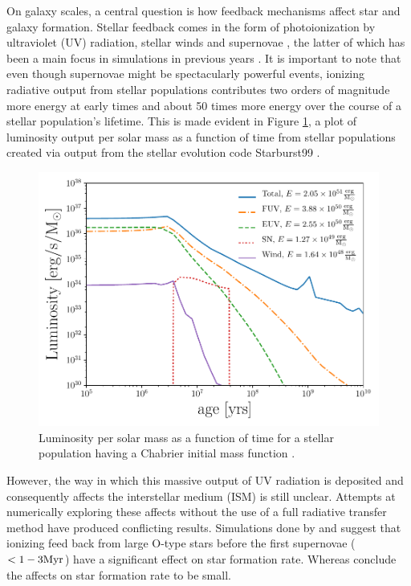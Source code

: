 \documentclass[fleq,usenatbib]{mnras}
\begin{document}
On galaxy scales, a central question is how feedback mechanisms affect star 
and galaxy formation. Stellar feedback comes in the form of photoionization by 
ultraviolet (UV) radiation, stellar winds and supernovae 
\citep{leithererEt99}, the latter of which has been a main focus in 
simulations in previous years \citep{agertzEt13}. It is important to note that 
even though supernovae might be spectacularly powerful events, ionizing 
radiative output from stellar populations contributes two orders of magnitude 
more energy at early times and about 50 times more energy over the course of a 
stellar population's lifetime. This is made evident in Figure \ref{fig:uvsn}, 
a plot of luminosity output per solar mass as a function of time from stellar 
populations created via output from the stellar evolution code Starburst99 
\citep{leithererEt99}. 
\begin{figure}
\includegraphics[width=1\linewidth]{Figures/uvsn.pdf}
\caption{Luminosity per solar mass as a function of time for a stellar 
population having a Chabrier initial mass function \citep{chabrier03}.}
\label{fig:uvsn}
\end{figure}

However, the way in which this massive output of UV radiation is deposited 
and consequently affects the interstellar medium (ISM) is still unclear. 
Attempts at numerically exploring these affects without the use of a full 
radiative transfer method have produced conflicting results. Simulations done
by \cite{gritschnederEt09} and \citep{walchEt12} suggest that ionizing feed 
back from large O-type stars before the first supernovae ($<1-3\rm{Myr}$) have 
a significant effect on star formation rate. Whereas \cite{daleEt12} 
conclude the affects on star formation rate to be small.
\end{document}
